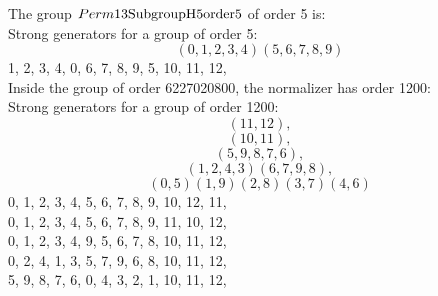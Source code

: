\noindent The group $Perm13{\rm Subgroup H5 order 5}$ of order 5 is:\\
Strong generators for a group of order 5:
$$
(0, 1, 2, 3, 4)(5, 6, 7, 8, 9)$$
1, 2, 3, 4, 0, 6, 7, 8, 9, 5, 10, 11, 12, \\
\bigskip
Inside the group of order 6227020800, the normalizer has order 1200:\\
Strong generators for a group of order 1200:
$$
(11, 12), 
$$
$$
(10, 11), 
$$
$$
(5, 9, 8, 7, 6), 
$$
$$
(1, 2, 4, 3)(6, 7, 9, 8), 
$$
$$
(0, 5)(1, 9)(2, 8)(3, 7)(4, 6)$$
0, 1, 2, 3, 4, 5, 6, 7, 8, 9, 10, 12, 11, \\
0, 1, 2, 3, 4, 5, 6, 7, 8, 9, 11, 10, 12, \\
0, 1, 2, 3, 4, 9, 5, 6, 7, 8, 10, 11, 12, \\
0, 2, 4, 1, 3, 5, 7, 9, 6, 8, 10, 11, 12, \\
5, 9, 8, 7, 6, 0, 4, 3, 2, 1, 10, 11, 12, \\
